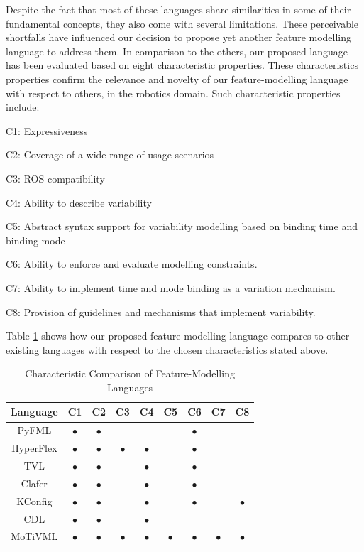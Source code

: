 \documentclass[conference]{IEEEtran}
\begin{document}
Despite the fact that most of these languages share similarities in some of their fundamental concepts, they also come with several limitations. These perceivable shortfalls have influenced our decision to propose yet another feature modelling language to address them. In comparison to the others, our proposed language has been evaluated based on eight characteristic properties. These characteristics properties confirm the relevance and novelty of our feature-modelling language with respect to others, in the robotics domain. Such characteristic properties include:
\begin{enumerate*}[label=(\roman*)]
	\item C1: Expressiveness
	\item C2: Coverage of a wide range of usage scenarios
	\item C3: ROS compatibility
	\item C4: Ability to describe variability
	\item C5: Abstract syntax support for variability modelling based on binding time and binding mode
	\item C6: Ability to enforce and evaluate modelling constraints.
	\item C7: Ability to implement time and mode binding as a variation mechanism.
	\item C8: Provision of guidelines and mechanisms that implement variability.
\end{enumerate*}

Table \ref{tab:compfml} shows how our proposed feature modelling language compares to other existing languages with respect to the chosen characteristics stated above.
\begin{table}[H]
\caption{Characteristic Comparison of Feature-Modelling Languages}
\begin{center}
\begin{tabular}{|c|c|c|c|c|c|c|c|c|}
\hline
    Language & C1 & C2 & C3 & C4 & C5 & C6 & C7 & C8 \\ \hline
    PyFML & $\bullet$ & $\bullet$ &  &  & & $\bullet$ & &\\\hline
    HyperFlex & $\bullet$ & $\bullet$ & $\bullet$ & $\bullet$ &  & $\bullet$ & &\\\hline
    TVL & $\bullet$ & $\bullet$ &  & $\bullet$ & & $\bullet$ & &\\ \hline
    Clafer & $\bullet$ & $\bullet$ &  & $\bullet$ &  & $\bullet$ & &\\ \hline
    KConfig & $\bullet$ & $\bullet$ & & $\bullet$ &  & $\bullet$ & & $\bullet$\\ \hline
    CDL & $\bullet$ & $\bullet$ &  &  $\bullet$ &  & & &\\ \hline
    MoTiVML & $\bullet$ & $\bullet$ & $\bullet$ & $\bullet$ & $\bullet$ & $\bullet$ & $\bullet$ & $\bullet$\\ \hline
\end{tabular}
\label{tab:compfml}
\end{center}
\end{table}
\end{document}
